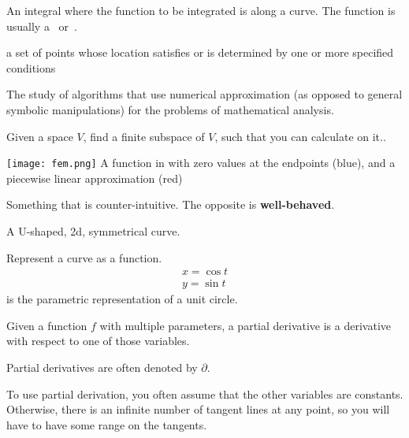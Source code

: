 \begin{definition}
    An integral where the function to be integrated is along a curve.
    The function is usually a~ or~.

\end{definition}

\begin{definition}[Locus]
    a set of points whose location satisfies or is determined by one or more
    specified conditions

\end{definition}

\begin{definition}
    The study of algorithms that use numerical approximation (as opposed to
    general symbolic manipulations) for the problems of mathematical analysis.

    Given a space $V$, find a finite subspace of $V$, such that you can
    calculate on it..

    \texttt{[image: fem.png]}
    A function in  with zero values at the endpoints (blue), and a piecewise
    linear approximation (red)

\end{definition}

\begin{definition}[Pathological]
    Something that is counter-intuitive. The opposite is \textbf{well-behaved}.

\end{definition}

\begin{definition}[Parabola]
    A U-shaped, 2d, symmetrical curve.
\end{definition}

\begin{definition}[Parameterization]
    Represent a curve as a function.
    \begin{align}
        x = \cos{t} \\
        y = \sin{t}
    \end{align}
    is the parametric representation of a unit circle.

\begin{definition}
    Given a function $f$ with multiple parameters, a partial derivative is a
    derivative with respect to one of those variables.

    Partial derivatives are often denoted by $\partial$.

    To use partial derivation, you often assume that the other variables are 
    constants. Otherwise, there is an infinite number of tangent lines at
    any point, so you will have to have some range on the tangents.

\end{definition}

\end{definition}

